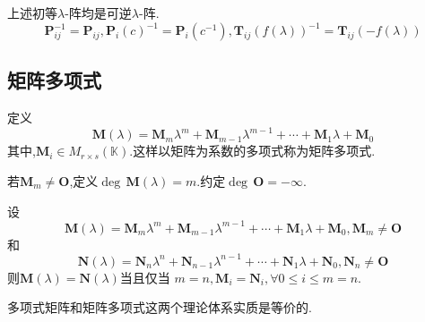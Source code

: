 \begin{formal}
    \begin{theorem}\label{thm:初等多项式矩阵的逆阵}
        上述初等$\lambda$-阵均是可逆$\lambda$-阵.
        \[
        \bm{P}_{ij}^{-1}=\bm{P}_{ij},
        \bm{P}_i\left(c\right)^{-1}=\bm{P}_i\left(c^{-1}\right),\bm{T}_{ij}\left(f\left(\lambda\right)\right)^{-1}=\bm{T}_{ij}\left(-f\left(\lambda\right)\right)
        \]
    \end{theorem}
\end{formal}
\subsection{矩阵多项式}
\begin{formal}
\begin{definition}[矩阵多项式]\label{def:矩阵多项式}
    定义
    \[
    \bm{M}\left(\lambda\right)=\bm{M}_m\lambda^m+\bm{M}_{m-1}\lambda^{m-1}+\cdots+\bm{M}_1\lambda+\bm{M}_0
    \]其中,$\bm{M}_{i}\in M_{r\times s}\left(\mathbb{K}\right)$.这样以矩阵为系数的多项式称为矩阵多项式.
\end{definition}
\end{formal}
\begin{formal}
\begin{definition}[矩阵多项式的次数]\label{def:矩阵多项式的次数}
    若$\bm{M}_m\neq \bm{O}$,定义$\deg\,\bm{M}\left(\lambda\right)=m$.约定$\deg\,\bm{O}=-\infty.$
\end{definition}
\end{formal}
\begin{formal}
\begin{definition}[矩阵多项式的相等]\label{def:矩阵多项式的相等}
    设
    \[
    \bm{M}\left(\lambda\right)=\bm{M}_m\lambda^m+\bm{M}_{m-1}\lambda^{m-1}+\cdots+\bm{M}_1\lambda+\bm{M}_0,\bm{M}_m\neq \bm{O}
    \]和
    \[
    \bm{N}\left(\lambda\right)=\bm{N}_n\lambda^n+\bm{N}_{n-1}\lambda^{n-1}+\cdots+\bm{N}_1\lambda+\bm{N}_0,\bm{N}_n\neq \bm{O}
    \]则$\bm{M}\left(\lambda\right)=\bm{N}\left(\lambda\right)$当且仅当
    $m=n,\bm{M}_i=\bm{N}_i,\forall 0\leqslant i\leqslant m=n.$
\end{definition}
\end{formal}
\begin{red}
    \begin{remark}
        多项式矩阵和矩阵多项式这两个理论体系实质是等价的.
    \end{remark}
\end{red}
